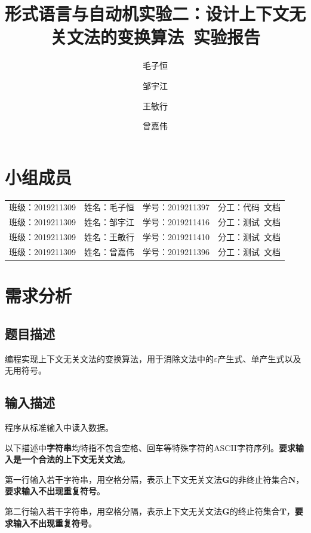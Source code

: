 \documentclass[lang=cn,11pt,a4paper,cite=authornum]{paper}
\title{形式语言与自动机实验二：设计上下文无关文法的变换算法\ 实验报告}
\author{毛子恒 \and 邹宇江 \and 王敏行 \and 曾嘉伟}
\institute{北京邮电大学\ 计算机学院}
\date{\zhtoday}
\begin{document}
\maketitle

\section*{小组成员}

\setlength{\tabcolsep}{7mm}
{
    \begin{table}[htbp]
        \centering
        \begin{tabular}{llll}
            班级：2019211309 & 姓名：毛子恒 & 学号：2019211397 & 分工：代码\ 文档 \\

            班级：2019211309 & 姓名：邹宇江 & 学号：2019211416 & 分工：测试\ 文档 \\

            班级：2019211309 & 姓名：王敏行 & 学号：2019211410 & 分工：测试\ 文档 \\

            班级：2019211309 & 姓名：曾嘉伟 & 学号：2019211396 & 分工：测试\ 文档 \\
        \end{tabular}
    \end{table}
}

\section{需求分析}

\subsection{题目描述}

编程实现上下文无关文法的变换算法，用于消除文法中的$\varepsilon$产生式、单产生式以及无用符号。

\subsection{输入描述}

程序从标准输入中读入数据。

以下描述中\textbf{字符串}均特指不包含空格、回车等特殊字符的ASCII字符序列。\textbf{要求输入是一个合法的上下文无关文法}。

第一行输入若干字符串，用空格分隔，表示上下文无关文法$\mathbf G$的非终止符集合$\mathbf N$，\textbf{要求输入不出现重复符号}。

第二行输入若干字符串，用空格分隔，表示上下文无关文法$\mathbf G$的终止符集合$\mathbf T$，\textbf{要求输入不出现重复符号}。
\end{document}
